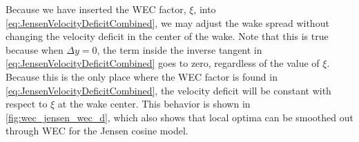 \documentclass[journal abbreviation, manuscript]{copernicus}
\begin{document}
	Because we have inserted the WEC factor, $\xi$, into \ref{eq:JensenVelocityDeficitCombined}, we may adjust the wake spread without changing the velocity deficit in the center of the wake. Note that this is true because when $\Delta y = 0$, the term inside the inverse tangent in \ref{eq:JensenVelocityDeficitCombined} goes to zero, regardless of the value of $\xi$. Because this is the only place where the WEC factor is found in \ref{eq:JensenVelocityDeficitCombined}, the velocity deficit will be constant with respect to $\xi$ at the wake center. This behavior is shown in \ref{fig:wec_jensen_wec_d}, which also shows that local optima can be smoothed out through WEC for the Jensen cosine model.
	
	
\end{document}
